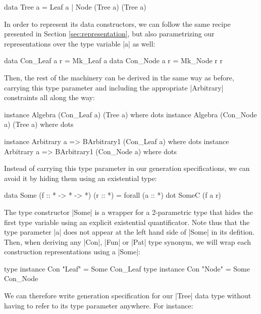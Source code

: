\begin{code}
data Tree a = Leaf a | Node (Tree a) (Tree a)
\end{code}

In order to represent its data constructors, we can follow the same recipe
presented in Section \ref{sec:representation}, but also parametrizing our
representations over the type variable |a| as well:

\begin{code}
data Con_Leaf a r = Mk_Leaf a
data Con_Node a r = Mk_Node r r
\end{code}

Then, the rest of the machinery can be derived in the same way as before,
carrying this type parameter and including the appropriate |Arbitrary|
constraints all along the way:

\begin{code}
instance Algebra (Con_Leaf a) (Tree a) where dots
instance Algebra (Con_Node a) (Tree a) where dots

instance Arbitrary a => BArbitrary1 (Con_Leaf a) where dots
instance Arbitrary a => BArbitrary1 (Con_Node a) where dots
\end{code}

%
Instead of carrying this type parameter in our generation specifications, we can
avoid it by hiding them using an existential type:

\begin{code}
data Some (f :: * -> * -> *) (r :: *) = forall (a :: *) dot SomeC (f a r)
\end{code}

The type constructor |Some| is a wrapper for a 2-parametric type that hides the
first type variable using an explicit existential quantificator.
%
Note thus that the type parameter |a| does not appear at the left hand side of
|Some| in its defition.
%
Then, when deriving any |Con|, |Fun| or |Pat| type synonym, we will wrap each
construction representations using a |Some|:

\begin{code}
type instance Con "Leaf" = Some Con_Leaf
type instance Con "Node" = Some Con_Node
\end{code}

We can therefore write generation specification for our |Tree| data type without
having to refer to its type parameter anywhere.
%
For instance:


